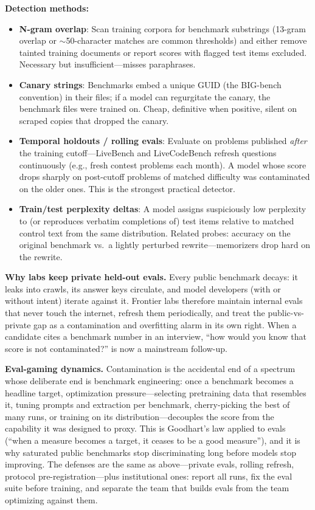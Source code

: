 \textbf{Detection methods:}
\begin{itemize}
    \item \textbf{N-gram overlap}: Scan training corpora for benchmark substrings (13-gram overlap or $\sim$50-character matches are common thresholds) and either remove tainted training documents or report scores with flagged test items excluded. Necessary but insufficient---misses paraphrases.
    \item \textbf{Canary strings}: Benchmarks embed a unique GUID (the BIG-bench convention) in their files; if a model can regurgitate the canary, the benchmark files were trained on. Cheap, definitive when positive, silent on scraped copies that dropped the canary.
    \item \textbf{Temporal holdouts / rolling evals}: Evaluate on problems published \textit{after} the training cutoff---LiveBench and LiveCodeBench refresh questions continuously (e.g., fresh contest problems each month). A model whose score drops sharply on post-cutoff problems of matched difficulty was contaminated on the older ones. This is the strongest practical detector.
    \item \textbf{Train/test perplexity deltas}: A model assigns suspiciously low perplexity to (or reproduces verbatim completions of) test items relative to matched control text from the same distribution. Related probes: accuracy on the original benchmark vs.\ a lightly perturbed rewrite---memorizers drop hard on the rewrite.
\end{itemize}

\textbf{Why labs keep private held-out evals.} Every public benchmark decays: it leaks into crawls, its answer keys circulate, and model developers (with or without intent) iterate against it. Frontier labs therefore maintain internal evals that never touch the internet, refresh them periodically, and treat the public-vs-private gap as a contamination and overfitting alarm in its own right. When a candidate cites a benchmark number in an interview, ``how would you know that score is not contaminated?'' is now a mainstream follow-up.

\textbf{Eval-gaming dynamics.} Contamination is the accidental end of a spectrum whose deliberate end is benchmark engineering: once a benchmark becomes a headline target, optimization pressure---selecting pretraining data that resembles it, tuning prompts and extraction per benchmark, cherry-picking the best of many runs, or training on its distribution---decouples the score from the capability it was designed to proxy. This is Goodhart's law applied to evals (``when a measure becomes a target, it ceases to be a good measure''), and it is why saturated public benchmarks stop discriminating long before models stop improving. The defenses are the same as above---private evals, rolling refresh, protocol pre-registration---plus institutional ones: report all runs, fix the eval suite before training, and separate the team that builds evals from the team optimizing against them.

